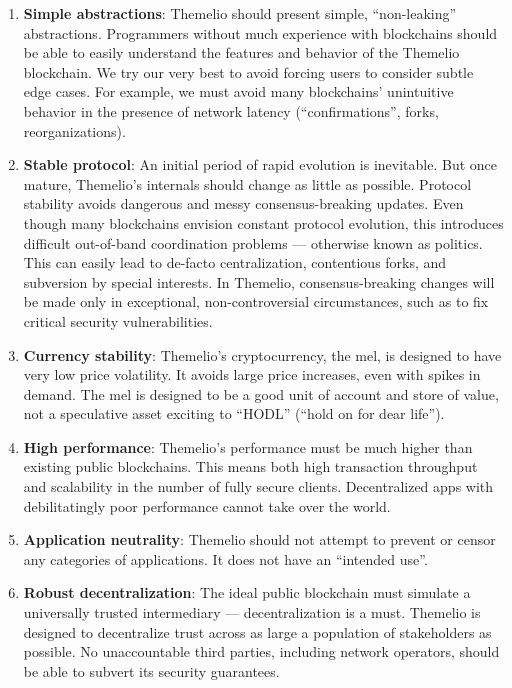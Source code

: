 \documentclass[headinclude,12pt]{scrbook}
\begin{document}
\begin{enumerate}
    \item \textbf{Simple abstractions}: Themelio should present simple, ``non-leaking'' abstractions. Programmers without much experience with blockchains should be able to easily understand the features and behavior of the Themelio blockchain. We try our very best to avoid forcing users to consider subtle edge cases. For example, we must avoid many blockchains' unintuitive behavior in the presence of network latency (``confirmations'', forks, reorganizations).
    \item \textbf{Stable protocol}: An initial period of rapid evolution is inevitable. But once mature, Themelio's internals should change as little as possible. Protocol stability avoids dangerous and messy consensus-breaking updates. Even though many blockchains envision constant protocol evolution, this introduces difficult out-of-band coordination problems --- otherwise known as politics.  This can easily lead to de-facto centralization, contentious forks, and subversion by special interests. In Themelio, consensus-breaking changes will be made only in exceptional, non-controversial circumstances, such as to fix critical security vulnerabilities.
    \item \textbf{Currency stability}: Themelio's cryptocurrency, the mel, is designed to have very low price volatility. It avoids large price increases, even with spikes in demand. The mel is designed to be a good unit of account and store of value, not a speculative asset exciting to ``HODL'' (``hold on for dear life'').
    \item \textbf{High performance}: Themelio's performance must be much higher than existing public blockchains. This means both high transaction throughput and scalability in the number of fully secure clients. Decentralized apps with debilitatingly poor performance cannot take over the world.
    \item \textbf{Application neutrality}: Themelio should not attempt to prevent or censor any categories of applications. It does not have an ``intended use''.
    \item \textbf{Robust decentralization}: The ideal public blockchain must simulate a universally trusted intermediary --- decentralization is a must. Themelio is designed to decentralize trust across as large a population of stakeholders as possible. No unaccountable third parties, including network operators, should be able to subvert its security guarantees.
\end{enumerate}
\end{document}
